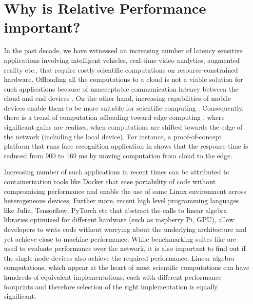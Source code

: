 \documentclass[conference]{IEEEtran}
\begin{document}
 \section{Why is Relative Performance important?}
 \label{sec:app}
 In the past decade, we have witnessed an increasing number of latency sensitive applications involving intelligent vehicles\cite{connectedvehicles}, real-time video analytics\cite{videoanalytics}, augmented reality\cite{arvr} etc.,  that require costly scientific computations on resource-constrained hardware. Offloading all the computations to a cloud is not a viable solution for such applications because of unacceptable communication latency between the cloud and end devices\cite{surveyMCC} \cite{towardsEdgeComputing}. On the other hand, increasing capabilities of mobile devices enable them to be more suitable for scientific computing\cite{smartPhonesForScientificComputing} \cite{raspberryEdgeComputing}. Consequently, there is a trend of computation offloading\cite{surveyOfComputationalOffloading2013} toward edge computing \cite{edgeComputing2016} \cite{towardsEdgeComputing} \cite{edgeComputing2015}, where significant gains are realized when computations are shifted towards the edge of the network (including the local device)\cite{EdgeComputingQuantifying}. For instance, a proof-of-concept platform that runs face recognition application in \cite{facerecog} shows that the response time is reduced from 900 to 169 ms by moving computation from cloud to the edge. 
 
 Increasing number of such applications in recent times can be attributed to containerization tools like Docker\cite{docker} that ease portability of code without compromising performance\cite{dockerForEdgeComputing} \cite{dockerhpc} and enable the use of same Linux environment across heterogeneous devices. Further more, recent high level programming languages like Julia\cite{julia}, Tensorflow\cite{tensorflow}, PyTorch\cite{pytorch} etc that abstract the calls to linear algebra libraries optimized for different hardware (such as raspberry Pi, GPU), allow developers to write code without worrying about the underlying architecture and yet achieve close to machine performance. While benchmarking suites like \cite{cavbench}\cite{edgeaibench} are used to evaluate performance over the network, it is also important to find out if the single node devices also achieve the required performance. Linear algebra computations, which appear at the heart of most scientific computations can have hundreds of equivalent implementations, each  with different performance footprints\cite{barthels2019linnea} and therefore selection of the right implementation is equally significant.
 
\end{document}
